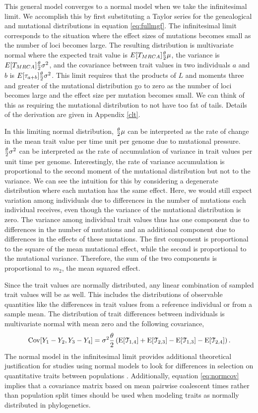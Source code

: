 This general model converges to a normal model when we take the infinitesimal
limit. We accomplish this by first substituting a Taylor series for the
genealogical and mutational distributions in equation \eqref{eq:fullmgf}. The
infinitesimal limit corresponds to the situation where the effect sizes of
mutations becomes small as the number of loci becomes large. The resulting
distribution is multivariate normal where the expected trait value is
$E[T_{MRCA}] \frac{\theta}{2} \mu$, the variance is $E[T_{MRCA}] \frac{\theta}{2} \sigma^2$, and the
covariance between trait values in two individuals $a$ and $b$ is
$E[\tau_{a+b}] \frac{\theta}{2} \sigma^2$. This limit requires that the products of $L$ and
moments three and greater of the mutational distribution go to zero as the
number of loci becomes large and the effect size per mutation becomes small. We
can think of this as requiring the mutational distribution to not have too fat
of tails. Details of the derivation are given in Appendix \ref{clt}.

In this limiting normal distribution, $\frac{\theta}{2} \mu$ can be interpreted as the rate of
change in the mean trait value per time unit per genome due to mutational
pressure. $\frac{\theta}{2} \sigma^2$ can be interpreted as the rate of accumulation of
variance in trait values per unit time per genome. Interestingly, the rate of
variance accumulation is proportional to the second moment of the mutational
distribution but not to the variance. We can see the intuition for this by
considering a degenerate distribution where each mutation has the same effect.
Here, we would still expect variation among individuals due to differences in
the number of mutations each individual receives, even though the variance of
the mutational distribution is zero. The variance among individual trait values
thus has one component due to differences in the number of mutations and an
additional component due to differences in the effects of these mutations. The
first component is proportional to the square of the mean mutational effect,
while the second is proportional to the mutational variance. Therefore, the sum
of the two components is proportional to $m_2$, the mean squared effect.

Since the trait values are normally distributed, any linear combination of
sampled trait values will be as well. This includes the distributions of
observable quantities like the differences in trait values from a reference
individual or from a sample mean. The distribution of trait differences between
individuals is multivariate normal with mean zero and the following covariance,
\begin{equation}
  \label{eq:normcov}
\mathrm{Cov}[Y_1-Y_2,Y_3-Y_4] = \sigma^2\frac{\theta}{2}\left( \mathrm{E}[\mathcal{T}_{1,4}] + \mathrm{E}[\mathcal{T}_{2,3}] -
\mathrm{E}[\mathcal{T}_{1,3}] - \mathrm{E}[\mathcal{T}_{2,4}] \right).
\end{equation}
The normal model in the infinitesimal limit provides additional theoretical
justification for studies using normal models to look for differences in
selection on quantitative traits between populations
\citep{Ovaskainen2011,Praebel2013,Robinson2015}. Additionally, equation
\eqref{eq:normcov} implies that a covariance matrix based on mean pairwise
coalescent times rather than population split times should be used when modeling
traits as normally distributed in phylogenetics.

 
